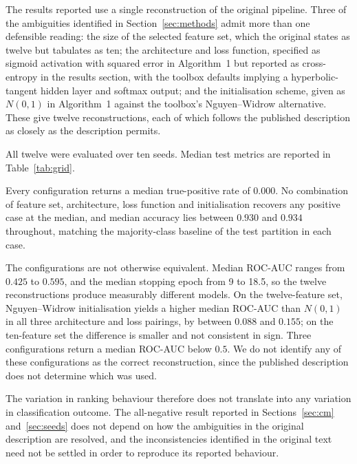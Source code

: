 The results reported use a single reconstruction of the original pipeline.
Three of the ambiguities identified in Section~\ref{sec:methods} admit more
than one defensible reading: the size of the selected feature set, which the
original states as twelve but tabulates as ten; the architecture and loss
function, specified as sigmoid activation with squared error in Algorithm~1 but
reported as cross-entropy in the results section, with the toolbox defaults
implying a hyperbolic-tangent hidden layer and softmax output; and the
initialisation scheme, given as $N(0,1)$ in Algorithm~1 against the toolbox's
Nguyen--Widrow alternative. These give twelve reconstructions, each of which
follows the published description as closely as the description permits.

All twelve were evaluated over ten seeds. Median test metrics are reported in
Table~\ref{tab:grid}.

Every configuration returns a median true-positive rate of $0.000$. No
combination of feature set, architecture, loss function and initialisation
recovers any positive case at the median, and median accuracy lies between
$0.930$ and $0.934$ throughout, matching the majority-class baseline of the
test partition in each case.

The configurations are not otherwise equivalent. Median ROC-AUC ranges from
$0.425$ to $0.595$, and the median stopping epoch from 9 to 18.5, so the twelve
reconstructions produce measurably different models. On the twelve-feature set,
Nguyen--Widrow initialisation yields a higher median ROC-AUC than $N(0,1)$ in
all three architecture and loss pairings, by between $0.088$ and $0.155$; on
the ten-feature set the difference is smaller and not consistent in sign. Three
configurations return a median ROC-AUC below $0.5$. We do not identify any of
these configurations as the correct reconstruction, since the published
description does not determine which was used.

The variation in ranking behaviour therefore does not translate into any
variation in classification outcome. The all-negative result reported in
Sections~\ref{sec:cm} and~\ref{sec:seeds} does not depend on how the
ambiguities in the original description are resolved, and the inconsistencies
identified in the original text need not be settled in order to reproduce its
reported behaviour.

